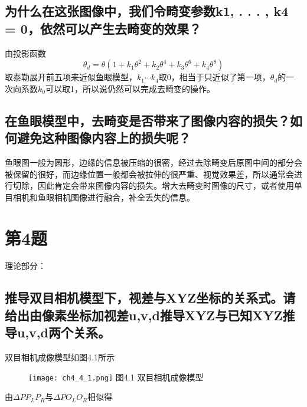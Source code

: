 \documentclass[40pt,a4paper，UTF8]{ctexart}
\numberwithin{equation}{section}
\begin{document}
\subsection{为什么在这张图像中，我们令畸变参数k1, . . . , k4 = 0，依然可以产生去畸变的效果？}
由投影函数
\begin{equation}
\theta_d = \theta (1+k_1\theta^2+k_2\theta^4+k_3\theta^6+k_4\theta^8)
\end{equation}
取泰勒展开前五项来近似鱼眼模型，$k_1\cdots k_4$取0，相当于只近似了第一项，$\theta_d$的一次向系数$k_0$可以取1，所以说仍然可以完成去畸变的操作。

\subsection{在鱼眼模型中，去畸变是否带来了图像内容的损失？如何避免这种图像内容上的损失呢？}
鱼眼图一般为圆形，边缘的信息被压缩的很密，经过去除畸变后原图中间的部分会被保留的很好，而边缘位置一般都会被拉伸的很严重、视觉效果差，所以通常会进行切除，因此肯定会带来图像内容的损失。增大去畸变时图像的尺寸，或者使用单目相机和鱼眼相机图像进行融合，补全丢失的信息。

\section{第4题}
理论部分：
\subsection{推导双目相机模型下，视差与XYZ坐标的关系式。请给出由像素坐标加视差u,v,d推导XYZ与已知XYZ推导u,v,d两个关系。}
双目相机成像模型如图4.1所示
\begin{figure}[H]
\centering
\texttt{[image: ch4\_4\_1.png]} {图4.1 双目相机成像模型}
\end{figure}

由$\Delta PP_LP_R$与$\Delta PO_LO_R$相似得
\end{document}

